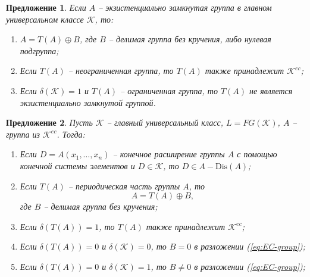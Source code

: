 \documentclass[12pt]{extarticle} %
\newtheorem{proposition}{Предложение}[section]
\def\K{{\mathcal{K}}}
\def\Kec{\mathcal{K}^{ec}}
\def\Dis{{\mathrm{Dis}}}
\begin{document}
\begin{proposition}
Если $A$ -- экзистенциально замкнутая группа в главном универсальном классе $\K$, то:
\begin{enumerate}
\item $A = T(A) \oplus B$, где $B$ -- делимая группа без кручения, либо нулевая подгруппа;
\item Если $T(A)$ -- неограниченная группа, то $T(A)$ также принадлежит $\Kec$;
\item Если $\delta(\K) = 1$ и $T(A)$ -- ограниченная группа, то $T(A)$ не является экзистенциально замкнутой группой.
\end{enumerate}
\end{proposition}

\begin{proposition}
Пусть $\K$ -- главный универсальный класс, $L = FG(\K)$, $A$ -- группа из $\Kec$. Тогда:
\begin{enumerate}
\item Если $D = A(x_1, \ldots, x_n)$ -- конечное расширение группы $A$ с помощью конечной системы элементов и $D \in \K$, то ${D \in A-\Dis(A)}$;
\item Если $T(A)$ -- периодическая часть группы $A$, то
\begin{equation}\label{eq:EC-group}
A = T(A) \oplus B,
\end{equation}
где $B$ -- делимая группа без кручения;
\item Если $\delta(T(A)) = 1$, то $T(A)$ также принадлежит $\Kec$;
\item Если $\delta(T(A)) = 0$ и $\delta(\K) = 0$, то $B = 0$ в разложении (\ref{eq:EC-group});
\item Если $\delta(T(A)) = 0$ и $\delta(\K) = 1$, то $B \neq 0$ в разложении (\ref{eq:EC-group});
\end{enumerate}
\end{proposition}
\end{document}
